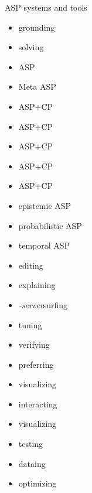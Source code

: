 \providecommand{\purpose}[1]{\hfill #1}
\begin{frame}[c]{ASP systems and tools}
  \begin{minipage}[t]{0.45\linewidth}
    \begin{itemize}
    \item<1> \gringo\purpose{grounding}
    \item<1> \clasp\purpose{solving}
    \item<1> \clingo\purpose{ASP}
    \item<1> \metasp\purpose{Meta ASP}
    \item<1> \clingcon\purpose{ASP+CP}
    \item<1> \fclingo\purpose{ASP+CP}
    \item<1> \clingodl\purpose{ASP+CP}
    \item<1> \clingolp\purpose{ASP+CP}
    \item<1> \clingolpx\purpose{ASP+CP}
    \item<1> \eclingo\purpose{epistemic ASP}
    \item<1> \plingo\purpose{probabilistic ASP}
    \item<1> \telingo\purpose{temporal ASP}
    \end{itemize}
  \end{minipage}
  \pause
  \begin{minipage}[t]{0.4\linewidth}
    \begin{itemize}
    \item<2> \clinsight\purpose{editing}
    \item<2> \xclingo\purpose{explaining}
    \item<2> \clingo\textit{-server}\purpose{surfing}
    \item<2> \acclingo\purpose{tuning}
    \item<2> \anthem\purpose{verifying}
    \item<2> \asprin\purpose{preferring}
    \item<2> \clingraph\purpose{visualizing}
    \item<2> \clinguin\purpose{interacting}
    \item<2> \viasp\purpose{visualizing}
    \item<2> \clintest\purpose{testing}
    \item<2> \clorm\purpose{dataing}
    \item<2> \ngo\purpose{optimizing}
  \end{itemize}
\end{minipage}
\end{frame}
%
